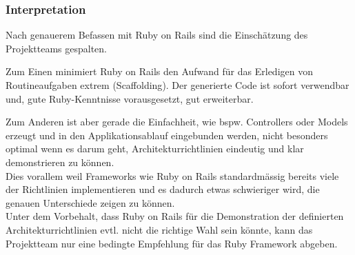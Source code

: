 \subsubsection*{Interpretation}
Nach genauerem Befassen mit Ruby on Rails sind die Einschätzung des Projektteams gespalten.

Zum Einen minimiert Ruby on Rails den Aufwand für das Erledigen von Routineaufgaben extrem (\gls{Scaffolding}). Der generierte Code ist sofort verwendbar und, gute Ruby-Kenntnisse vorausgesetzt, gut erweiterbar.

Zum Anderen ist aber gerade die Einfachheit, wie bspw. Controllers oder Models erzeugt und in den Applikationsablauf eingebunden werden, nicht besonders optimal wenn es darum geht, Architekturrichtlinien eindeutig und klar demonstrieren zu können.\\
Dies vorallem weil Frameworks wie Ruby on Rails standardmässig bereits viele der Richtlinien implementieren und es dadurch etwas schwieriger wird, die genauen Unterschiede zeigen zu können.\\

Unter dem Vorbehalt, dass Ruby on Rails für die Demonstration der definierten Architekturrichtlinien evtl. nicht die richtige Wahl sein könnte, kann das Projektteam nur eine bedingte Empfehlung für das Ruby Framework abgeben.